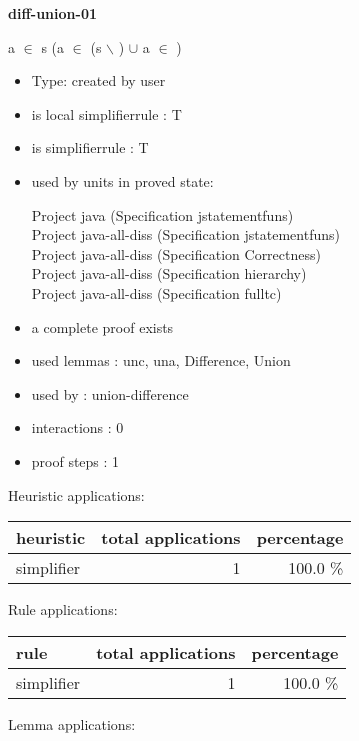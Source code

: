 \documentclass[a4paper]{article}
\begin{document}
{\LARGE\bf diff-union-01}\label{lemma-diff-union-01}

\medskip

 \Fol \Not a $\in$ s \Imp (a $\in$ (s $\backslash$ ) $\cup$  \Equiv a $\in$ )

\begin{itemize}

\item Type: created by user

\item is local simplifierrule : T
\item is simplifierrule : T
\item used by units in proved state:

Project java (Specification jstatementfuns) \\
Project java-all-diss (Specification jstatementfuns) \\
Project java-all-diss (Specification Correctness) \\
Project java-all-diss (Specification hierarchy) \\
Project java-all-diss (Specification fulltc)
\item       a complete proof exists
\item       used lemmas  : unc, una, Difference, Union
\item       used by      : union-difference
\item       interactions : 0
\item       proof steps  : 1
\end{itemize}

\medskip


Heuristic applications:

\begin{supertabular}{l|r|r}
heuristic	& total applications & percentage \\ \hline
simplifier & 1 & 100.0 \% \\

\end{supertabular}

Rule applications:

\begin{supertabular}{l|r|r}
rule	        & total applications & percentage \\ \hline
simplifier & 1 & 100.0 \% \\

\end{supertabular}

Lemma applications:
\end{document}

